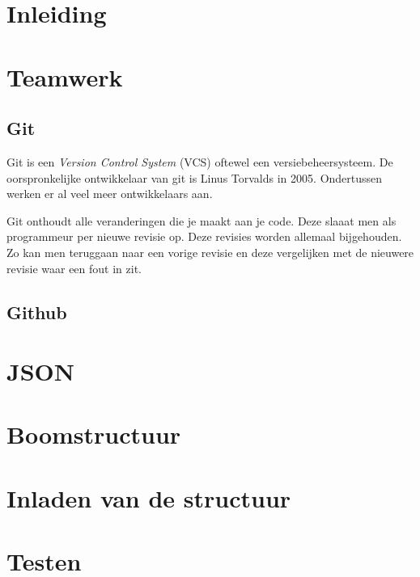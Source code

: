 \section{Inleiding}

\section{Teamwerk}
\subsection{Git}
Git is een \textit{Version Control System} (VCS) oftewel een versiebeheersysteem. De oorspronkelijke ontwikkelaar van git is Linus Torvalds in 2005.\cite{init_git} Ondertussen werken er al veel meer ontwikkelaars aan. 

Git onthoudt alle veranderingen die je maakt aan je code. Deze slaaat men als programmeur per nieuwe revisie op. Deze revisies worden allemaal bijgehouden. Zo kan men teruggaan naar een vorige revisie en deze vergelijken met de nieuwere revisie waar een fout in zit.
\subsection{Github}

\section{JSON}


\section{Boomstructuur}

\section{Inladen van de structuur}

\section{Testen}
